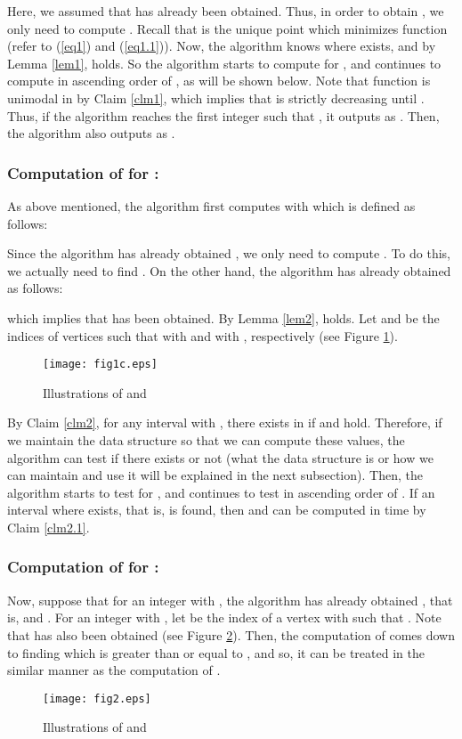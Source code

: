 \documentclass[a4paper]{llncs}
\begin{document}
Here, we assumed that  has already been obtained.
Thus, in order to obtain , we only need to compute .
Recall that  is the unique point which minimizes function  (refer to (\ref{eq1}) and (\ref{eq1.1})).
Now, the algorithm knows where  exists, and by Lemma \ref{lem1},  holds.
So the algorithm starts to compute  for ,
and continues to compute in ascending order of , as will be shown below.
Note that function  is unimodal in  by Claim \ref{clm1}, 
which implies that  is strictly decreasing until .
Thus, if the algorithm reaches the first integer  such that ,
it outputs  as .
Then, the algorithm also outputs  as .


\subsubsection{Computation of  for :}
As above mentioned, the algorithm first computes  with  which is defined as follows:

Since the algorithm has already obtained ,
we only need to compute .
To do this, we actually need to find .
On the other hand, the algorithm has already obtained  as follows:

which implies that  has been obtained.
By Lemma \ref{lem2},  holds.
Let  and  be the indices of vertices  
such that  with 
and  with , respectively (see Figure \ref{fig1}).
\begin{figure}[h]
\centering
\texttt{[image: fig1c.eps]} 
\caption{Illustrations of  and }
\label{fig1}
\end{figure}
By Claim \ref{clm2}, for any interval  with , there exists  in 
if  and  hold.
Therefore, if we maintain the data structure so that we can compute these values,
the algorithm can test if there exists  or not
(what the data structure is or how we can maintain and use it will be explained in the next subsection).
Then, the algorithm starts to test for ,
and continues to test in ascending order of .
If an interval where  exists, that is,  is found,
then  and  can be computed in  time by Claim \ref{clm2.1}.


\subsubsection{Computation of  for :}
Now, suppose that for an integer  with ,
the algorithm has already obtained , that is,  and .
For an integer  with , let  be the index of a vertex with 
such that .
Note that  has also been obtained (see Figure \ref{fig2}).
Then, the computation of  comes down to finding  which is greater than or equal to ,
and so, it can be treated in the similar manner as the computation of .
\begin{figure}[h]
\centering
\texttt{[image: fig2.eps]} 
\caption{Illustrations of  and }
\label{fig2}
\end{figure}
\end{document}
